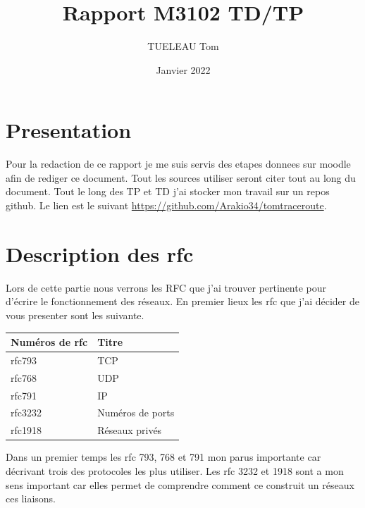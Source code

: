 \documentclass[5pt]{article}
\title{Rapport M3102 TD/TP}
\author{TUELEAU Tom}
\date{Janvier 2022}
\begin{document}
    \maketitle    
    \tableofcontents
    \newpage
    \section{Presentation}
    Pour la redaction de ce rapport je me suis servis des etapes donnees sur moodle afin de rediger ce document. Tout les sources utiliser seront citer tout au long du document. Tout le long des TP et TD j'ai stocker mon travail sur un repos github. Le lien est le suivant \url{https://github.com/Arakio34/tomtraceroute}.
    

    \section{Description des rfc}
    Lors de cette partie nous verrons les RFC que j'ai trouver pertinente pour d'écrire le fonctionnement des réseaux. En premier lieux les rfc que j'ai décider de vous presenter sont les suivante. 
    \begin{center}
        \begin{tabular}{|l|l|}
            \hline
            Numéros de rfc & Titre \\
            \hline
            rfc793 & TCP \\
            \hline
            rfc768 & UDP \\
            \hline
            rfc791 & IP \\
            \hline
            rfc3232 & Numéros de ports \\
            \hline
            rfc1918 & Réseaux privés \\
            \hline
        \end{tabular}
    \end{center}
    Dans un premier temps les rfc 793, 768 et 791 mon parus importante car décrivant trois des protocoles les plus utiliser. Les rfc 3232 et 1918 sont a mon sens important car elles permet de comprendre comment ce construit un réseaux ces liaisons.  
\end{document}
